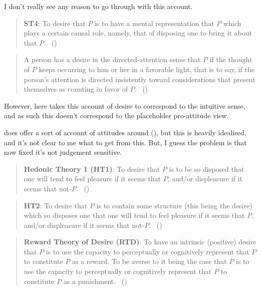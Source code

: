 \documentclass[10pt]{article}
\begin{document}
{\color{red}
  I don't really see any reason to go through with this account.
}

\begin{quote}
  \textbf{ST4}:
  To desire that \(P\) is to have a mental representation that \(P\) which plays a certain causal role, namely, that of disposing one to bring it about that \(P\).\nolinebreak
  \mbox{ }\hfill(\citeyear[24]{Schroeder:2004aa})
\end{quote}

\begin{quote}
  A person has a desire in the directed-attention sense that \(P\) if the thought of \(P\) keeps occurring to him or her in a favorable light, that is to say, if the person’s attention is directed insistently toward considerations that present themselves as counting in favor of \(P\).\nolinebreak
  \mbox{ }(\citeyear[39]{Scanlon:1998aa})
\end{quote}

However, here \citeauthor{Scanlon:1998aa} takes this account of desire to correspond to the intuitive sense, and as such this doesn't correspond to the placeholder pro-attitude view.

\citeauthor{Scanlon:1998aa} does offer a sort of account of attitudes around (\citeyear[20]{Scanlon:1998aa}), but this is heavily idealised, and it's not clear to me what to get from this.
But, I guess the problem is that now fixed it's not judgement sensitive.


\begin{quote}
  \textbf{Hedonic Theory 1 (HT1)}:
  To desire that \(P\) is to be so disposed that one will tend to feel pleasure if it seems that \(P\), and/or displeasure if it seems that not-\(P\).\nolinebreak
  \mbox{ }\hfill(\citeyear[27]{Schroeder:2004aa})
\end{quote}

\begin{quote}
  \textbf{HT2}:
  To desire that \(P\) is to contain some structure (this being the desire) which so disposes one that one will tend to feel pleasure if it seems that \(P\), and/or displeasure if it seems that not-\(P\).\nolinebreak
  \mbox{ }\hfill(\citeyear[27]{Schroeder:2004aa})
\end{quote}


\begin{quote}
  \textbf{Reward Theory of Desire (RTD)}:
  To have an intrinsic (positive) desire that \(P\) is to use the capacity to perceptually or cognitively represent that \(P\) to constitute \(P\) as a reward.
  To be averse to it being the case that \(P\) is to use the capacity to perceptually or cognitively represent that \(P\) to constitute \(P\) as a punishment.\nolinebreak
  \mbox{ }\hfill(\citeyear[131]{Schroeder:2004aa})
\end{quote}
\end{document}
